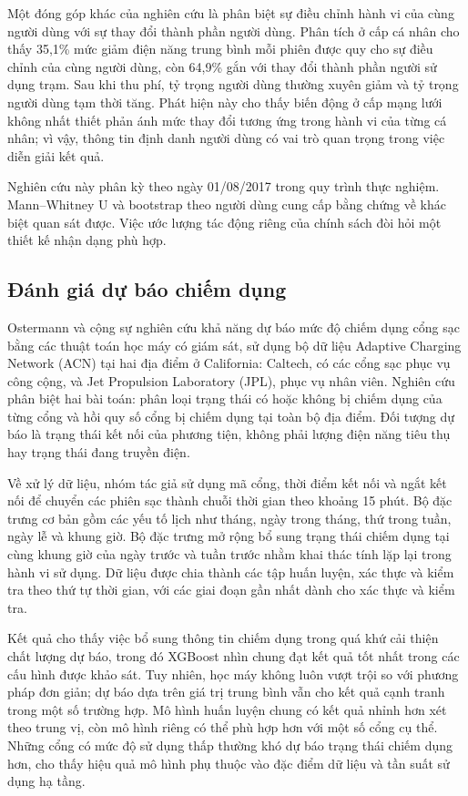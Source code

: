 \documentclass[conference,a4paper]{IEEEtran}
\begin{document}
Một đóng góp khác của nghiên cứu là phân biệt sự điều chỉnh hành vi của cùng người dùng với sự thay đổi thành phần người dùng. Phân tích ở cấp cá nhân cho thấy 35,1\% mức giảm điện năng trung bình mỗi phiên được quy cho sự điều chỉnh của cùng người dùng, còn 64,9\% gắn với thay đổi thành phần người sử dụng trạm. Sau khi thu phí, tỷ trọng người dùng thường xuyên giảm và tỷ trọng người dùng tạm thời tăng. Phát hiện này cho thấy biến động ở cấp mạng lưới không nhất thiết phản ánh mức thay đổi tương ứng trong hành vi của từng cá nhân; vì vậy, thông tin định danh người dùng có vai trò quan trọng trong việc diễn giải kết quả.

Nghiên cứu này phân kỳ theo ngày 01/08/2017 trong quy trình thực nghiệm. Mann--Whitney U \cite{mannwhitney1947} và bootstrap theo người dùng cung cấp bằng chứng về khác biệt quan sát được. Việc ước lượng tác động riêng của chính sách đòi hỏi một thiết kế nhận dạng phù hợp.

\subsection{Đánh giá dự báo chiếm dụng}

Ostermann và cộng sự \cite{ostermann2022} nghiên cứu khả năng dự báo mức độ chiếm dụng cổng sạc bằng các thuật toán học máy có giám sát, sử dụng bộ dữ liệu Adaptive Charging Network (ACN) tại hai địa điểm ở California: Caltech, có các cổng sạc phục vụ công cộng, và Jet Propulsion Laboratory (JPL), phục vụ nhân viên. Nghiên cứu phân biệt hai bài toán: phân loại trạng thái có hoặc không bị chiếm dụng của từng cổng và hồi quy số cổng bị chiếm dụng tại toàn bộ địa điểm. Đối tượng dự báo là trạng thái kết nối của phương tiện, không phải lượng điện năng tiêu thụ hay trạng thái đang truyền điện.

Về xử lý dữ liệu, nhóm tác giả sử dụng mã cổng, thời điểm kết nối và ngắt kết nối để chuyển các phiên sạc thành chuỗi thời gian theo khoảng 15 phút. Bộ đặc trưng cơ bản gồm các yếu tố lịch như tháng, ngày trong tháng, thứ trong tuần, ngày lễ và khung giờ. Bộ đặc trưng mở rộng bổ sung trạng thái chiếm dụng tại cùng khung giờ của ngày trước và tuần trước nhằm khai thác tính lặp lại trong hành vi sử dụng. Dữ liệu được chia thành các tập huấn luyện, xác thực và kiểm tra theo thứ tự thời gian, với các giai đoạn gần nhất dành cho xác thực và kiểm tra.

Kết quả cho thấy việc bổ sung thông tin chiếm dụng trong quá khứ cải thiện chất lượng dự báo, trong đó XGBoost nhìn chung đạt kết quả tốt nhất trong các cấu hình được khảo sát. Tuy nhiên, học máy không luôn vượt trội so với phương pháp đơn giản; dự báo dựa trên giá trị trung bình vẫn cho kết quả cạnh tranh trong một số trường hợp. Mô hình huấn luyện chung có kết quả nhỉnh hơn xét theo trung vị, còn mô hình riêng có thể phù hợp hơn với một số cổng cụ thể. Những cổng có mức độ sử dụng thấp thường khó dự báo trạng thái chiếm dụng hơn, cho thấy hiệu quả mô hình phụ thuộc vào đặc điểm dữ liệu và tần suất sử dụng hạ tầng.
\end{document}
